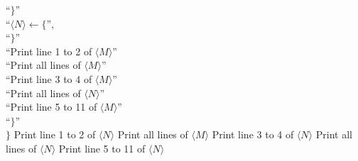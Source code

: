 \documentclass[letterpaper]{article}
\begin{document}
\begin{multicols}{2}
\begin{minipage}{0.4\textwidth}
\begin{algorithm}[H]
            \nl \hspace{1.0cm}``$\}$''\\
            \nl \hspace{1.0cm}``$ \langle N \rangle \gets \{$'',\\
            \nl \hspace{1.0cm}``$\}$''\\
            \nl \hspace{1.0cm}``Print line 1 to 2 of $\langle M \rangle$''\\
            \nl \hspace{1.0cm}``Print all lines of $\langle M \rangle$''\\
            \nl \hspace{1.0cm}``Print line 3 to 4 of $\langle M \rangle$''\\
            \nl \hspace{1.0cm}``Print all lines of $\langle N \rangle$''\\
            \nl \hspace{1.0cm}``Print line 5 to 11 of $\langle M \rangle$''\\
            \nl \hspace{0.5cm}``$\}$''\\
            $ \}$\;
            Print line 1 to 2 of $\langle N \rangle$\;
            Print all lines of $\langle M \rangle$\;
            Print line 3 to 4 of $\langle N \rangle$\;
            Print all lines of $\langle N \rangle$\;
            Print line 5 to 11 of $\langle N \rangle$\;
        \end{algorithm}
    \end{minipage}
    

\end{multicols}
\end{document}
